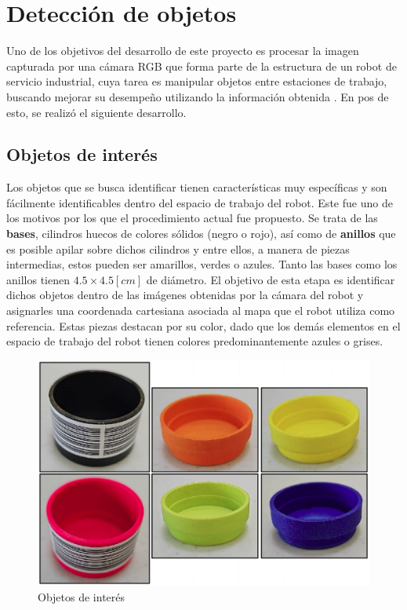 \chapter{Detección de objetos}
Uno de los objetivos del desarrollo de este proyecto es procesar la imagen capturada por una cámara RGB que forma parte de la estructura de un robot de servicio industrial, cuya tarea es manipular objetos entre estaciones de trabajo, buscando mejorar su desempeño utilizando la información obtenida . En pos de esto, se realizó el siguiente desarrollo.

\section{Objetos de interés}
Los objetos que se busca identificar tienen características muy específicas y son fácilmente identificables dentro del espacio de trabajo del robot. Este fue uno de los motivos por los que el procedimiento actual fue propuesto. Se trata de las \textbf{bases}, cilindros huecos de colores sólidos (negro o rojo), así como de \textbf{anillos} que es posible apilar sobre dichos cilindros y entre ellos, a manera de piezas intermedias, estos pueden ser amarillos, verdes o azules. Tanto las bases como los anillos tienen $4.5\times4.5 [cm]$ de diámetro. 
El objetivo de esta etapa es identificar dichos objetos dentro de las imágenes obtenidas por la cámara del robot y asignarles una coordenada cartesiana asociada al mapa que el robot utiliza como referencia.
Estas piezas destacan por su color, dado que los demás elementos en el espacio de trabajo del robot tienen colores predominantemente azules o grises.
 
\begin{figure}[ht]
\centering
\includegraphics[scale= 0.15]{Figures/Pieces.png}
    \caption{Objetos de interés}
    \label{fig:Pieces}
\end{figure}

